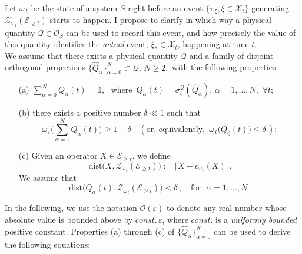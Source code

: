 \documentclass[12pt]{article}
\begin{document}
\begin{enumerate}
{Let $\omega_{\,t}$ be the state of a system $S$ right before an event $\lbrace \pi_{\xi}, \xi \in \mathcal{X}_{t}\rbrace$ generating 
$\mathcal{Z}_{\omega_{\,t}}(\mathcal{E}_{\geq t})$ starts to happen. I propose to clarify in which way a physical quantity 
$\mathcal{Q} \in \mathcal{O}_{S}$ can be used to record this event, and how precisely the value of this quantity identifies the \textit{actual} event, $\xi_{*} \in \mathcal{X}_t$, happening at time $t$.\\
We assume that there exists a physical quantity $\mathcal{Q}$ and a family of disjoint orthogonal projections $\lbrace \widehat{Q}_{\alpha} \rbrace_{\alpha=0}^{N} \subset \mathcal{Q},\, N\geq 2,$ with the following properties:
\begin{enumerate}
\item[(a)]{$\sum_{\alpha=0}^{N} Q_{\alpha}(t) = \mathds{1}$, \, where\, $Q_{\alpha}(t) = \sigma_{t}^{\mathcal{Q}}(\widehat{Q}_{\alpha}),\,
\alpha = 1,\dots, N, \,\, \forall t$;}
\item[(b)]{there exists a positive number $\delta\ll 1$ such that 
$$\omega_{\,t}\Big(\sum_{\alpha=1}^{N}Q_{\alpha}(t)\Big) \geq 1-\delta \quad (\text{or, equivalently,} \,\,\, \omega_{\,t}\big(Q_{0}(t)\big) \leq \delta\,); $$}
\item[(c)]{Given an operator $X\in \mathcal{E}_{\geq t}$, we define 
$$\text{dist}\big(X, \mathcal{Z}_{\omega_{\,t}}(\mathcal{E}_{\geq t})\big):= \Vert X - \epsilon_{\omega_{\,t}} (X) \Vert.$$
We assume that
\begin{equation}\label{dist}
\text{dist} \big(Q_{\alpha}(t), \mathcal{Z}_{\omega_{\,t}}(\mathcal{E}_{\geq t})\big)  < \delta\,, \quad \text{for }\,\, \alpha=1,\dots, N\,.
\end{equation}
}
\end{enumerate}
In the following, we use the notation $\mathcal{O}(\varepsilon)$ to denote any real number whose absolute value is bounded above by
$const.\, \varepsilon$, where $const.$ is a \textit{uniformly bounded} positive constant. Properties (a) through (c) of 
$\lbrace \widehat{Q}_{\alpha} \rbrace_{\alpha=0}^{N}$ can be used to derive the following equations:

}
\end{enumerate}
\end{document}
